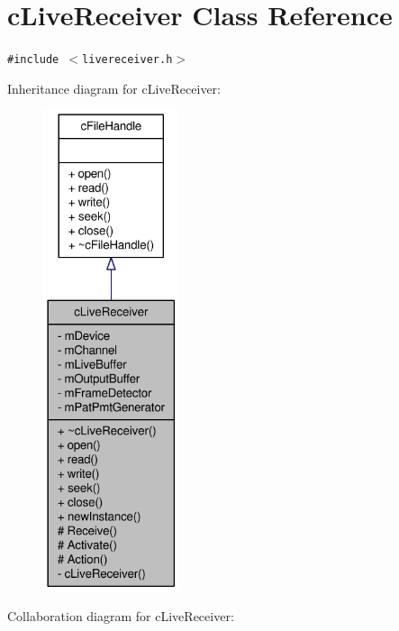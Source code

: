 \hypertarget{classcLiveReceiver}{
\section{cLiveReceiver Class Reference}
\label{classcLiveReceiver}
}
{\tt \#include $<$livereceiver.h$>$}

Inheritance diagram for cLiveReceiver:\nopagebreak
\begin{figure}[H]
\begin{center}
\leavevmode
\includegraphics[height=400pt]{classcLiveReceiver__inherit__graph}
\end{center}
\end{figure}
Collaboration diagram for cLiveReceiver:\nopagebreak
